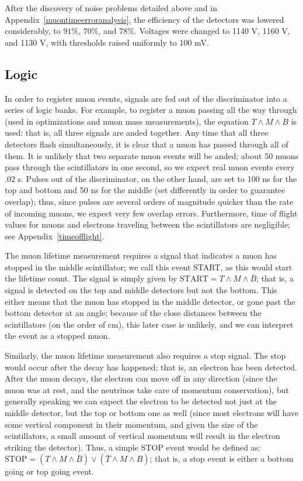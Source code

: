 After the discovery of noise problems detailed above and in Appendix~\ref{muontimeerroranalysis}, the efficiency of the detectors was lowered considerably, to $91\%$, $70\%$, and $78\%$. Voltages were changed to 1140 V, 1160 V, and 1130 V, with thresholds raised uniformly to 100 mV.

\subsection{Logic}
\label{logic}

In order to register muon events, signals are fed out of the discriminator into a series of logic banks. For example, to register a muon passing all the way through (used in optimizations and muon mass measurements), the equation $T \wedge M \wedge B$ is used: that is, all three signals are anded together. Any time that all three detectors flash simultaneously, it is clear that a muon has passed through all of them. It is unlikely that two separate muon events will be anded; about 50 muons pass through the scintillators in one second, so we expect real muon events every .02 s. Pulses out of the discriminator, on the other hand, are set to 100 ns for the top and bottom and 50 ns for the middle (set differently in order to guarantee overlap); thus, since pulses are several orders of magnitude quicker than the rate of incoming muons, we expect very few overlap errors. Furthermore, time of flight values for muons and electrons traveling between the scintillators are negligible; see Appendix~\ref{timeofflight}.

The muon lifetime measurement requires a signal that indicates a muon has stopped in the middle scintillator; we call this event START, as this would start the lifetime count. The signal is simply given by $\mathrm{START} = T \wedge M \wedge \bar{B}$; that is, a signal is detected on the top and middle detectors but not the bottom. This either means that the muon has stopped in the middle detector, or gone past the bottom detector at an angle; because of the close distances between the scintillators (on the order of cm), this later case is unlikely, and we can interpret the event as a stopped muon.

Similarly, the muon lifetime measurement also requires a stop signal. The stop would occur after the decay has happened; that is, an electron has been detected. After the muon decays, the electron can move off in any direction (since the muon was at rest, and the neutrinos take care of momentum conservation), but generally speaking we can expect the electron to be detected not just at the middle detector, but the top or bottom one as well (since most electrons will have some vertical component in their momentum, and given the size of the scintillators, a small amount of vertical momentum will result in the electron striking the detector). Thus, a simple STOP event would be defined as: $\mathrm{STOP} = (T \wedge M \wedge \bar{B}) \vee (\bar{T} \wedge M \wedge B)$; that is, a stop event is either a bottom going or top going event.

